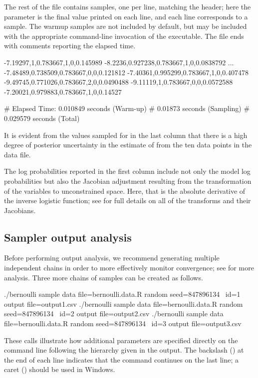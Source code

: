\documentclass[article]{jss}
\begin{document}
The rest of the file contains samples, one per line, matching the
header; here the parameter  is the final value printed on
each line, and each line corresponds to a sample.  The warmup samples
are not included by default, but may be included with the appropriate
command-line invocation of the executable. The file ends with comments reporting the elapsed time.
%
\begin{Code}
-7.19297,1,0.783667,1,0,0.145989
-8.2236,0.927238,0.783667,1,0,0.0838792
...
-7.48489,0.738509,0.783667,0,0,0.121812
-7.40361,0.995299,0.783667,1,0,0.407478
-9.49745,0.771026,0.783667,2,0,0.0490488
-9.11119,1,0.783667,0,0,0.0572588
-7.20021,0.979883,0.783667,1,0,0.14527

#  Elapsed Time: 0.010849 seconds (Warm-up)
#                0.01873 seconds (Sampling)
#                0.029579 seconds (Total)
\end{Code}
%
It is evident from the values sampled for  in the last
column that there is a high degree of posterior uncertainty in the
estimate of  from the ten data points in the data file.

The log probabilities reported in the first column include not only
the model log probabilities but also the Jacobian adjustment resulting
from the transformation of the variables to unconstrained space.
Here, that is the absolute derivative of the inverse logistic
function;  see \citep{Stan:2013} for full details on all of the
transforms and their Jacobians.


\subsection{Sampler output analysis}

Before performing output analysis, we recommend generating multiple
independent chains in order to more effectively monitor convergence;
see \citep{GelmanRubin:1992} for more analysis.  Three more chains of
samples can be created as follows.
%
\begin{CodeChunk}
\begin{CodeInput}
./bernoulli sample data file=bernoulli.data.R random seed=847896134 \
            id=1 output file=output1.csv
./bernoulli sample data file=bernoulli.data.R random seed=847896134 \
            id=2 output file=output2.csv
./bernoulli sample data file=bernoulli.data.R random seed=847896134 \
            id=3 output file=output3.csv
\end{CodeInput}
\end{CodeChunk}
%
These calls illustrate how additional parameters are specified
directly on the command line following the hierarchy given in the
output.  The backslash (\code{\textbackslash}) at the end of each line indicates
that the command continues on the last line;  a caret (\code{\textasciicircum})
should be used in Windows.
\end{document}
